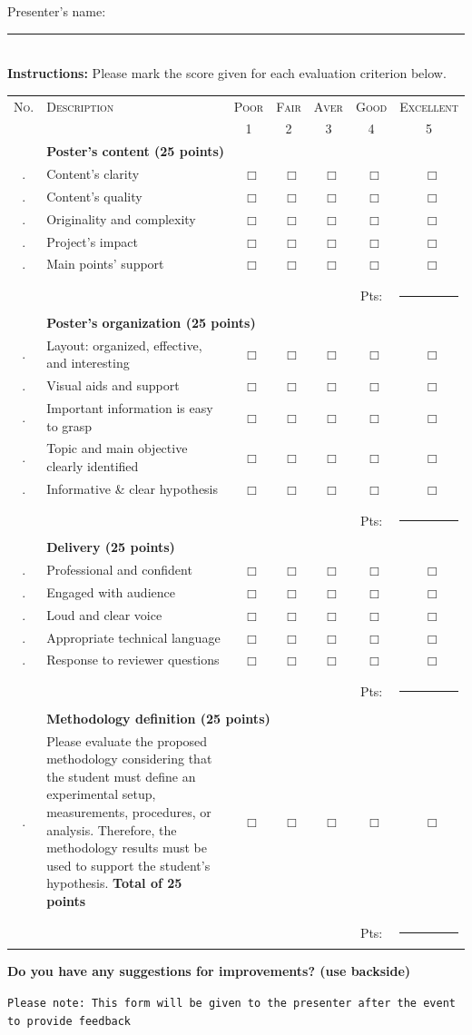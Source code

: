 \documentclass[letterpaper]{article}
\newcounter{hnumber}
\newcounter{qnumber}
\newcommand{\yesno}{{\Large ~$\Box$}}
\newcommand{\question}[1]{
    \hfill \relax \thehnumber.\theqnumber\hfill\hfill &\textsf{#1} &{\small\yesno} & {\small\yesno} &{\small\yesno} &{\small\yesno}&{\small\yesno}\stepcounter{qnumber}\\
}
\newcommand{\heading}[1]{
	\stepcounter{hnumber}
	\thehnumber &\multicolumn{4}{l}{\bf\textsf{#1}} \\ \midrule%
	}
\begin{document}
\centering
Presenter's name: \rule{6cm}{0.5pt}\\

\textbf{Instructions:} Please mark the score given for each evaluation criterion below.

\begin{longtable}{c p{8cm}ccccc}
\textsc{No.} &\textsc{Description}&\footnotesize \textsc{Poor} & \footnotesize \textsc{Fair} & \footnotesize \textsc{Aver}& \footnotesize \textsc{Good}&\footnotesize \textsc{Excellent}\\
& & 1&2&3&4&5\\
\heading{Poster's content (25 points)}
\question{Content's clarity}
\question{Content's quality}
\question{Originality and complexity}
\question{Project's impact}
\question{Main points' support}
\\

&&&&&Pts:&\rule{1.5cm}{0.5pt}\\
\setcounter{qnumber}{0}
\stepcounter{qnumber}
\heading{Poster's organization (25 points)}
\question{Layout: organized, effective, and interesting}
\question{Visual aids and support}
\question{Important information is easy to grasp}
\question{Topic and main objective clearly identified}
\question{Informative \& clear hypothesis}
\\

&&&&&Pts:&\rule{1.5cm}{0.5pt}\\
\setcounter{qnumber}{0}
\stepcounter{qnumber}
\heading{Delivery (25 points)}
\question{Professional and confident}
\question{Engaged with audience}
\question{Loud and clear voice}
\question{Appropriate technical language}
\question{Response to reviewer questions}
\\
&&&&&Pts:&\rule{1.5cm}{0.5pt}\\

\heading{Methodology definition (25 points)}
\setcounter{qnumber}{0}
\stepcounter{qnumber}
\question{Please evaluate the proposed methodology considering that the student must define an experimental setup, measurements, procedures, or analysis. Therefore, the methodology results must be used to support the student’s hypothesis. \textbf{Total of 25 points}}


\\&&&&&Pts:&\rule{1.5cm}{0.5pt}\\
\bottomrule
\end{longtable}

\small \noindent \bf Do you have any suggestions for improvements? (use backside)
\\ 
\vspace{2cm}

\texttt{Please note:
 This form will be given to the presenter after the event to provide feedback}
\end{document}
